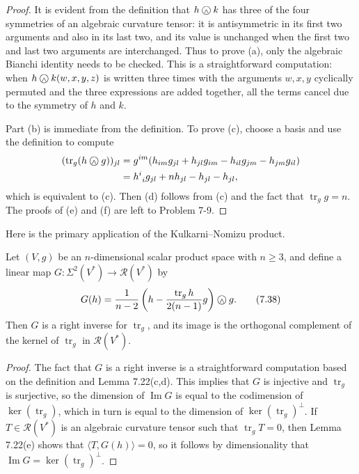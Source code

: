 \begin{proof}
It is evident from the definition that $h \owedge k$ has three of the four symmetries of an algebraic curvature tensor: it is antisymmetric in its first two arguments and also in its last two, and its value is unchanged when the first two and last two arguments are interchanged. Thus to prove (a), only the algebraic Bianchi identity needs to be checked. This is a straightforward computation: when $h \owedge k(w, x, y, z)$ is written three times with the arguments $w, x, y$ cyclically permuted and the three expressions are added together, all the terms cancel due to the symmetry of $h$ and $k$.

Part (b) is immediate from the definition. To prove (c), choose a basis and use the definition to compute
\begin{align*}
(\operatorname{tr}_g(h \owedge g))_{jl} &= g^{im}(h_{im}g_{jl} + h_{jl}g_{im} - h_{il}g_{jm} - h_{jm}g_{il}) \\
&= h^i_{\ i}g_{jl} + nh_{jl} - h_{jl} - h_{jl},
\end{align*}
which is equivalent to (c). Then (d) follows from (c) and the fact that $\operatorname{tr}_g g = n$. The proofs of (e) and (f) are left to Problem 7-9.
\end{proof}

Here is the primary application of the Kulkarni--Nomizu product.

\begin{proposition}
\label{prop:right-inverse-trace}
Let $(V,g)$ be an $n$-dimensional scalar product space with $n \geq 3$, and define a linear map $G: \Sigma^2(V^*) \to \mathcal{R}(V^*)$ by
\begin{equation}
G(h) = \frac{1}{n-2}\left(h - \frac{\operatorname{tr}_g h}{2(n-1)}g\right) \owedge g. \tag{7.38}
\end{equation}
Then $G$ is a right inverse for $\operatorname{tr}_g$, and its image is the orthogonal complement of the kernel of $\operatorname{tr}_g$ in $\mathcal{R}(V^*)$.
\end{proposition}

\begin{proof}
The fact that $G$ is a right inverse is a straightforward computation based on the definition and Lemma 7.22(c,d). This implies that $G$ is injective and $\operatorname{tr}_g$ is surjective, so the dimension of $\operatorname{Im} G$ is equal to the codimension of $\ker(\operatorname{tr}_g)$, which in turn is equal to the dimension of $\ker(\operatorname{tr}_g)^\perp$. If $T \in \mathcal{R}(V^*)$ is an algebraic curvature tensor such that $\operatorname{tr}_g T = 0$, then Lemma 7.22(e) shows that $\langle T, G(h)\rangle = 0$, so it follows by dimensionality that $\operatorname{Im} G = \ker(\operatorname{tr}_g)^\perp$.
\end{proof}

